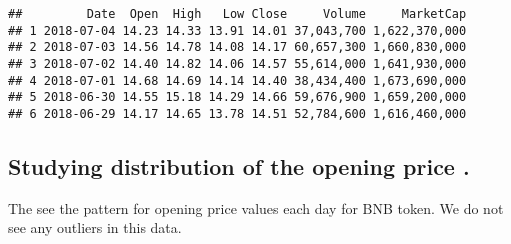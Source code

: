 \documentclass[]{article}
\newenvironment{Shaded}{\begin{snugshade}}{\end{snugshade}}
\newcommand{\KeywordTok}[1]{\textcolor[rgb]{0.13,0.29,0.53}{\textbf{#1}}}
\newcommand{\DataTypeTok}[1]{\textcolor[rgb]{0.13,0.29,0.53}{#1}}
\newcommand{\CharTok}[1]{\textcolor[rgb]{0.31,0.60,0.02}{#1}}
\newcommand{\StringTok}[1]{\textcolor[rgb]{0.31,0.60,0.02}{#1}}
\newcommand{\OtherTok}[1]{\textcolor[rgb]{0.56,0.35,0.01}{#1}}
\newcommand{\OperatorTok}[1]{\textcolor[rgb]{0.81,0.36,0.00}{\textbf{#1}}}
\newcommand{\NormalTok}[1]{#1}
\begin{document}
\begin{Shaded}
\end{Shaded}

\begin{verbatim}
##         Date  Open  High   Low Close     Volume     MarketCap
## 1 2018-07-04 14.23 14.33 13.91 14.01 37,043,700 1,622,370,000
## 2 2018-07-03 14.56 14.78 14.08 14.17 60,657,300 1,660,830,000
## 3 2018-07-02 14.40 14.82 14.06 14.57 55,614,000 1,641,930,000
## 4 2018-07-01 14.68 14.69 14.14 14.40 38,434,400 1,673,690,000
## 5 2018-06-30 14.55 15.18 14.29 14.66 59,676,900 1,659,200,000
## 6 2018-06-29 14.17 14.65 13.78 14.51 52,784,600 1,616,460,000
\end{verbatim}

\subsection{Studying distribution of the opening price
.}\label{studying-distribution-of-the-opening-price-.}

The see the pattern for opening price values each day for BNB token. We
do not see any outliers in this data.

\begin{Shaded}
\end{Shaded}
\end{document}
